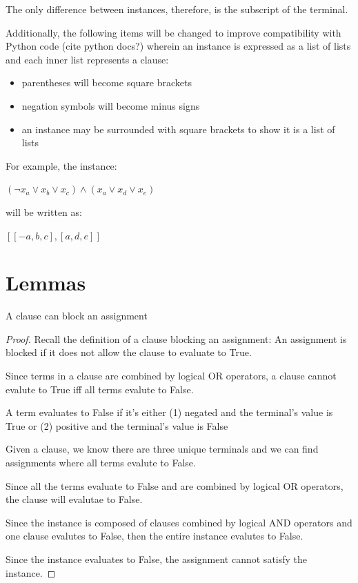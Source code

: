 \documentclass[manuscript]{acmart}
\begin{document}
    The only difference between instances, therefore, is the subscript of the terminal.
    
    Additionally, the following items will be changed to improve compatibility
    with Python code (cite python docs?) wherein an instance is expressed as
    a list of lists and each inner list represents a clause:
    \begin{itemize}
        \item parentheses will become square brackets
        \item negation symbols will become minus signs
        \item an instance may be surrounded with square brackets to show it is a list of lists
    \end{itemize}
   
    For example, the instance:
    
    $(\neg x_a \lor x_b \lor x_c) \land (x_a \lor x_d \lor x_e)$

    will be written as:

    $[[-a, b, c], [a, d, e]]$


    \section{Lemmas}

    \begin{lemma}
        A clause can block an assignment    
    \end{lemma}
    \begin{proof}
        Recall the definition of a clause blocking an assignment:
        An assignment is blocked if it does not allow the clause to evaluate to True.

        Since terms in a clause are combined by logical OR operators, a 
        clause cannot evalute to True iff all terms evalute to False.

        A term evaluates to False if it's either (1) negated and the terminal's
        value is True or (2) positive and the terminal's value is False

        Given a clause, we know there are three unique terminals and we can
        find assignments where all terms evalute to False.

        Since all the terms evaluate to False and are combined by logical OR operators, 
        the clause will evalutae to False.

        Since the instance is composed of clauses combined by logical AND operators 
        and one clause evalutes to False, then the entire instance evalutes to False.

        Since the instance evaluates to False, the assignment cannot satisfy
        the instance.
    \end{proof}
\end{document}
